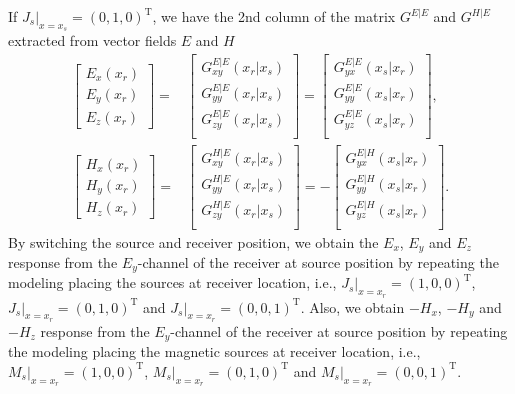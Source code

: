 \documentclass[a4paper,10pt]{article}
\begin{document}
If $J_s|_{x=x_s}=(0,1,0)^\mathrm{T}$, we have the 2nd column of the matrix $G^{E|E}$ and $G^{H|E}$ extracted from vector fields $E$ and $H$
\begin{subequations}
  \begin{align}
  \begin{bmatrix}
    E_x(x_r)\\
    E_y(x_r)\\
    E_z(x_r)
  \end{bmatrix} = &\begin{bmatrix}
    G_{xy}^{E|E}(x_r|x_s)\\
    G_{yy}^{E|E}(x_r|x_s)\\
    G_{zy}^{E|E}(x_r|x_s)\\
  \end{bmatrix}=\begin{bmatrix}
  G_{yx}^{E|E}(x_s|x_r)\\
  G_{yy}^{E|E}(x_s|x_r)\\
  G_{yz}^{E|E}(x_s|x_r)\\
  \end{bmatrix},\\
  \begin{bmatrix}
    H_x(x_r)\\
    H_y(x_r)\\
    H_z(x_r)
  \end{bmatrix} =& \begin{bmatrix}
    G_{xy}^{H|E}(x_r|x_s)\\
    G_{yy}^{H|E}(x_r|x_s)\\
    G_{zy}^{H|E}(x_r|x_s)\\
  \end{bmatrix}=-\begin{bmatrix}
  G_{yx}^{E|H}(x_s|x_r)\\
  G_{yy}^{E|H}(x_s|x_r)\\
  G_{yz}^{E|H}(x_s|x_r)\\
  \end{bmatrix}.
  \end{align}
\end{subequations}
By switching the source and receiver position, we obtain the $E_x$, $E_y$ and $E_z$ response from the $E_y$-channel of the receiver at source position by repeating the modeling placing the sources at receiver location, i.e., $J_s|_{x=x_r}=(1,0,0)^\mathrm{T}$, $J_s|_{x=x_r}=(0,1,0)^\mathrm{T}$ and $J_s|_{x=x_r}=(0,0,1)^\mathrm{T}$. Also, we obtain  $-H_x$, $-H_y$ and $-H_z$ response from  the $E_y$-channel of the receiver at source position by repeating the modeling placing the magnetic sources at receiver location, i.e., $M_s|_{x=x_r}=(1,0,0)^\mathrm{T}$, $M_s|_{x=x_r}=(0,1,0)^\mathrm{T}$ and $M_s|_{x=x_r}=(0,0,1)^\mathrm{T}$.
\end{document}
